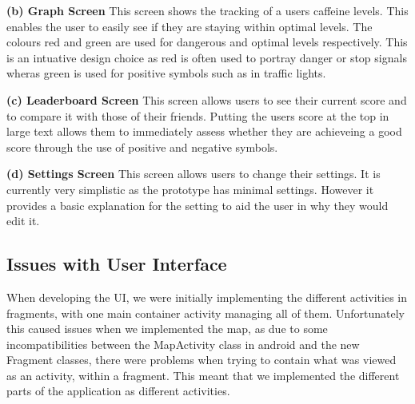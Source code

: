 \textbf{(b) Graph Screen} \newline
This screen shows the tracking of a users caffeine levels. This enables the user to easily see if they are staying within optimal levels. The colours red and green are used for dangerous and optimal levels respectively. This is an intuative design choice as red is often used to portray danger or stop signals wheras green is used for positive symbols such as in traffic lights. 

\textbf{(c) Leaderboard Screen} \newline
This screen allows users to see their current score and to compare it with those of their friends. Putting the users score at the top in large text allows them to immediately assess whether they are achieveing a good score through the use of positive and negative symbols. 

\textbf{(d) Settings Screen} \newline
This screen allows users to change their settings. It is currently very simplistic as the prototype has minimal settings. However it provides a basic explanation for the setting to aid the user in why they would edit it. 

\subsection{Issues with User Interface}
When developing the UI, we were initially implementing the different activities in fragments, with one main container activity managing all of them. Unfortunately this caused issues when we implemented the map, as due to some incompatibilities between the MapActivity class in android and the new Fragment classes, there were problems when trying to contain what was viewed as an activity, within a fragment. This meant that we implemented the different parts of the application as different activities.
